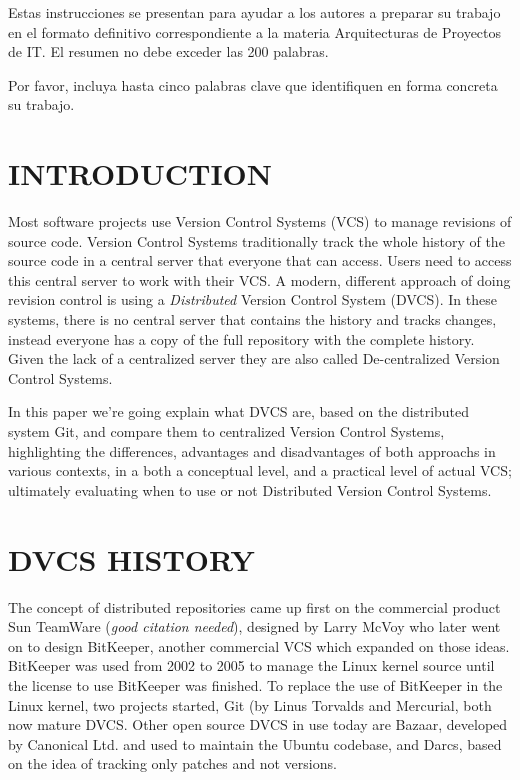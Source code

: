 \abstract
Estas instrucciones se presentan para ayudar a los autores a preparar su trabajo en el formato definitivo correspondiente a la materia Arquitecturas de Proyectos de IT. El resumen no debe exceder las 200 palabras.
\endabstract

\keywords%
Por favor, incluya hasta cinco palabras clave que identifiquen en forma concreta su trabajo.
\endkeywords

\section{INTRODUCTION}

Most software projects use Version Control Systems (VCS) to manage revisions
of source code. 
Version Control Systems traditionally track the whole history of the
source code in a central server that everyone that can access. 
Users need to access this central server to work with their VCS.
A modern, different approach of doing revision control is using a \emph{Distributed} Version Control System (DVCS).
In these systems, there is no central server that contains the history and tracks changes,
instead everyone has a copy of the full repository with the complete history.
Given the lack of a centralized server they are also called De-centralized Version Control Systems.

In this paper we're going explain what DVCS are, based on the distributed system Git, 
and compare them to centralized Version Control Systems,
highlighting the differences, advantages and disadvantages of both approachs in various 
contexts, in a both a conceptual level, and a practical level of actual VCS; ultimately 
evaluating when to use or not Distributed Version Control Systems. 


\section{DVCS HISTORY}

The concept of distributed repositories came up first on the commercial product 
Sun TeamWare (\emph{good citation needed}), designed by Larry McVoy who later went 
on to design BitKeeper, another commercial VCS which expanded on those ideas. 
BitKeeper was used from 2002 to 2005 to manage the Linux kernel source until 
the license to use BitKeeper was finished. 
To replace the use of BitKeeper in the Linux kernel, two projects started, Git (by
Linus Torvalds \cite{linusgit} and Mercurial, both now mature DVCS. 
Other open source DVCS in use today are Bazaar, 
developed by Canonical Ltd. and used to maintain the Ubuntu codebase, and Darcs, based on 
the idea of tracking only patches and not versions.


